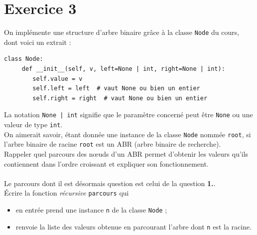 \documentclass[a4paper,12pt,eval,firamath]{nsi}
\begin{document}
\newpage


\section*{Exercice 3 \small}

\resetquestion
On implémente une structure d'arbre binaire grâce à la classe \texttt{Node} du cours, dont voici un extrait :

\begin{pyc}
      \begin{verbatim}
class Node:
     def __init__(self, v, left=None | int, right=None | int):
        self.value = v
        self.left = left  # vaut None ou bien un entier
        self.right = right  # vaut None ou bien un entier
\end{verbatim}
\end{pyc}

La notation \texttt{None | int}  signifie que le paramètre concerné peut être \texttt{None} ou une valeur de type \texttt{int}.\\


On aimerait savoir, étant donnée une instance de la classe \texttt{Node} nommée \texttt{root}, si l'arbre binaire de racine \texttt{root} est un ABR (arbre binaire de recherche).\\ 

\question Rappeler quel parcours des n\oe uds d'un ABR permet d'obtenir les valeurs qu'ils contiennent dans l'ordre croissant et expliquer son fonctionnement.\\

\\

Le parcours dont il est désormais question est celui de la question \textbf{1.}.\\

\question Écrire la fonction \textit{récursive} \texttt{parcours} qui
\begin{itemize}
    \item en entrée prend une instance \texttt{n}   de la classe \texttt{Node} ;
    \item renvoie la liste des valeurs obtenue en parcourant l'arbre dont \texttt{n} est la racine.
\end{itemize} 

\\
\end{document}
